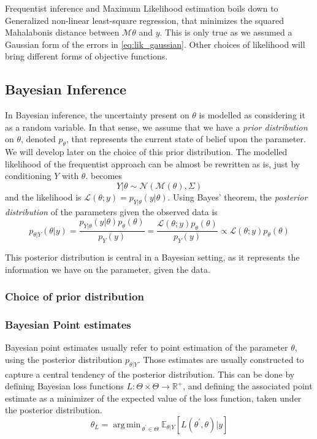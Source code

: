 \documentclass[a4paper,11pt]{article}
\newcommand{\Ex}{\mathbb{E}}
\DeclareMathOperator*{\argmin}{arg\,min \,}
\theoremstyle{defi}
\numberwithin{thmCounter}{section}
\begin{document}
  Frequentist inference and Maximum Likelihood estimation boils down to Generalized non-linear least-square regression, that minimizes the squared Mahalabonis distance between $\mathcal{M}{\theta}$ and $y$. This is only true as we assumed a Gaussian form of the errors in \cref{eq:lik_gaussian}. Other choices of likelihood will bring different forms of objective functions. 

\subsection{Bayesian Inference}
\label{sec:bayesian_inference_MAP}
In Bayesian inference, the uncertainty present on $\theta$ is modelled as considering it as a random variable. In that sense, we assume that we have a \emph{prior distribution} on $\theta$, denoted $p_{\theta}$, that represents the current state of belief upon the parameter. We will develop later on the choice of this prior distribution.
The modelled likelihood of the frequentist approach can be almost be rewritten as is, just by conditioning $Y$ with $\theta$.
 becomes
\begin{equation}
  Y | \theta \sim \mathcal{N}(\mathcal{M}(\theta), \Sigma)
\end{equation}
and the likelihood is $\mathcal{L}(\theta;y) = p_{Y|\theta}(y | \theta)$.
Using Bayes' theorem, the \emph{posterior distribution} of the parameters given the observed data is
\begin{equation}
  \label{eq:bayes_posterior}
  p_{\theta |Y}(\theta |y) = \frac{p_{Y|\theta}(y | \theta)p_{\theta}(\theta)}{p_Y(y)} = \frac{\mathcal{L}(\theta;y)p_{\theta}(\theta)}{p_Y(y)} \propto \mathcal{L}(\theta;y)p_{\theta}(\theta)
\end{equation}

This posterior distribution is central in a Bayesian setting, as it represents the information we have on the parameter, given the data.

\subsubsection{Choice of prior distribution}
\label{sec:choice_prior}


\subsubsection{Bayesian Point estimates}
\label{sec:bayes_point_estimates}
Bayesian point estimates usually refer to point estimation of the parameter $\theta$, using the posterior distribution $p_{\theta |Y}$. Those estimates are usually constructed to capture a central tendency of the posterior distribution. 
This can be done by defining Bayesian loss functions $L: \Theta \times \Theta \rightarrow \mathbb{R}^+$, and defining the associated point estimate as a minimizer of the expected value of the loss function, taken under the posterior distribution.
\begin{equation}
  \theta_{L} = \argmin_{\theta^{\prime} \in \Theta} \Ex_{\theta|Y}\left[L(\theta^{\prime}, \theta) | y\right]
\end{equation}
\end{document}
